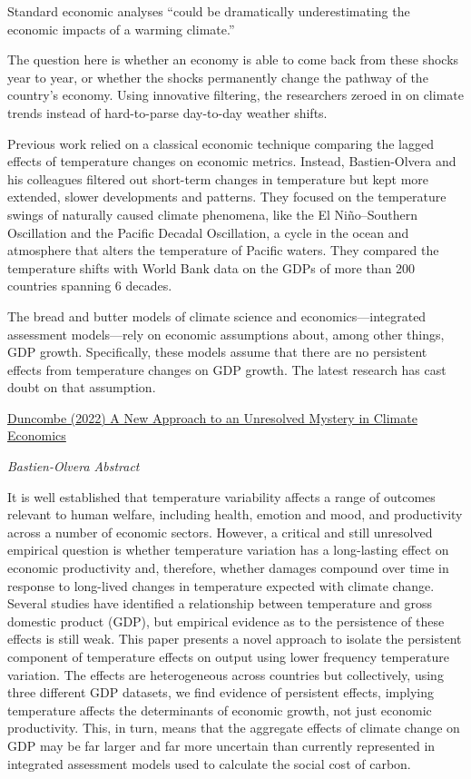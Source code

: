 \documentclass[
]{book}
\begin{document}
Standard economic analyses ``could be dramatically underestimating the economic impacts of a warming climate.''

The question here is whether an economy is able to come back from these shocks year to year, or whether the shocks permanently change the pathway of the country's economy.
Using innovative filtering, the researchers zeroed in on climate trends instead of hard-to-parse day-to-day weather shifts.

Previous work relied on a classical economic technique comparing the lagged effects of temperature changes on economic metrics.
Instead, Bastien-Olvera and his colleagues filtered out short-term changes in temperature but kept more extended, slower developments and patterns. They focused on the temperature swings of naturally caused climate phenomena, like the El Niño--Southern Oscillation and the Pacific Decadal Oscillation, a cycle in the ocean and atmosphere that alters the temperature of Pacific waters.
They compared the temperature shifts with World Bank data on the GDPs of more than 200 countries spanning 6 decades.

The bread and butter models of climate science and economics---integrated assessment models---rely on economic assumptions about, among other things, GDP growth. Specifically, these models assume that there are no persistent effects from temperature changes on GDP growth. The latest research has cast doubt on that assumption.

\href{https://eos.org/articles/a-new-approach-to-an-unresolved-mystery-in-climate-economics}{Duncombe (2022) A New Approach to an Unresolved Mystery in Climate Economics}

\emph{Bastien-Olvera Abstract}

It is well established that temperature variability affects a range of outcomes relevant to human welfare, including health, emotion and mood, and productivity across a number of economic sectors. However, a critical and still unresolved empirical question is whether temperature variation has a long-lasting effect on economic productivity and, therefore, whether damages compound over time in response to long-lived changes in temperature expected with climate change. Several studies have identified a relationship between temperature and gross domestic product (GDP), but empirical evidence as to the persistence of these effects is still weak. This paper presents a novel approach to isolate the persistent component of temperature effects on output using lower frequency temperature variation. The effects are heterogeneous across countries but collectively, using three different GDP datasets, we find evidence of persistent effects, implying temperature affects the determinants of economic growth, not just economic productivity. This, in turn, means that the aggregate effects of climate change on GDP may be far larger and far more uncertain than currently represented in integrated assessment models used to calculate the social cost of carbon.
\end{document}
